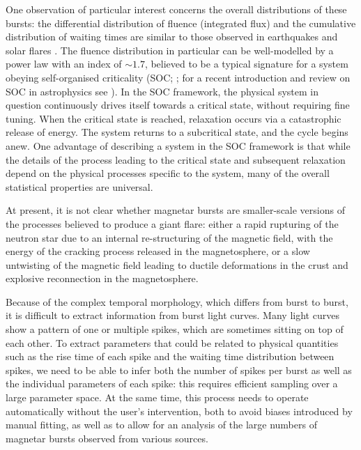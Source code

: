 \documentclass[12pt]{emulateapj}
\begin{document}
One observation of particular interest concerns the overall distributions of these bursts: the differential distribution of fluence (integrated flux) and 
the cumulative distribution of waiting times are similar to those observed in earthquakes and solar flares \citep{cheng1996,gogus1999,gogus2000,prieskorn2012}. The fluence distribution
in particular can be well-modelled by a power law with an index of $\sim\!\! 1.7$, believed to be a typical signature for a system obeying 
self-organised criticality (SOC; \citealp{bak1987,bak1988}; for a recent introduction and review on SOC in astrophysics see \citealp{aschwanden2014}). 
In the SOC framework, the physical system in question continuously drives itself towards a critical state,
without requiring fine tuning. When the critical state is reached, relaxation occurs via a catastrophic release of energy. The system returns
to a subcritical state, and the cycle begins anew. 
One advantage of describing a system in the SOC framework is that while the details of the process leading to the critical state and subsequent
relaxation depend on the physical processes specific to the system, many of the overall statistical properties are universal.

At present, it is not clear whether magnetar bursts are smaller-scale versions of the processes believed to produce a giant flare:
either a rapid rupturing of the neutron star due to an internal re-structuring of the magnetic field, with the energy of the cracking process
released in the magnetosphere, or a slow untwisting of the magnetic field leading to ductile deformations in the crust and explosive 
reconnection in the magnetosphere.

Because of the complex temporal morphology, which differs from burst to burst, it is difficult to extract information from burst light curves. 
Many light curves show a pattern of one or multiple spikes, which are sometimes sitting on top of each other. To extract parameters that could be related
to physical quantities such as the rise time of each spike and the waiting time distribution between spikes, we need to be able to infer both the 
number of spikes per burst as well as the individual parameters of each spike: this requires efficient sampling over a large parameter space.
At the same time, this process needs to operate automatically without the user's intervention, both to avoid biases introduced by manual fitting, as well as
 to allow for an analysis of the large numbers of magnetar bursts observed from various sources.
 
\end{document}
